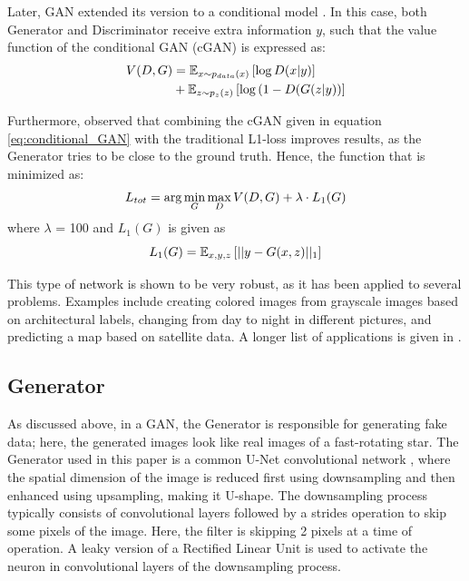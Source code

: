 Later, GAN extended its version to a conditional model \cite{mirza2014conditional}. In this case, both Generator and Discriminator receive extra information $y$, such that the value function of the conditional GAN (cGAN) is expressed as:
\begin{equation}
	\centering
	\begin{aligned}
		V(D, G) &= \mathbb{E}_{x \sim p_{data}(x)} \left[ \log D(x|y) \right] \\
		&+ \mathbb{E}_{z \sim p_{z}(z)} \left[ \log \left( 1-D(G(z|y) \right) \right]
	\end{aligned}
	\label{eq:conditional_GAN}
\end{equation}

Furthermore, \cite{isola2017image} observed that combining the cGAN given in equation \ref{eq:conditional_GAN} with the traditional L1-loss improves results, as the Generator tries to be close to the ground truth. Hence, the function that is minimized as:
\begin{equation}
	\centering
	L_{tot} = \arg \min_{G} \max_{D} V(D, G) + \lambda \cdot L_1(G)
	\label{eq:total_gen_loss}
\end{equation}
where $\lambda$ = 100 and $L_1(G)$ is given as
\begin{equation}
	\centering
	L_1(G) = \mathbb{E}_{x,y,z} \left[ ||{y - G(x,z)}||_1 \right]
	\label{eq:l1_loss}
\end{equation}

This type of network is shown to be very robust, as it has been applied to several problems. Examples include creating colored images from grayscale images based on architectural labels, changing from day to night in different pictures, and predicting a map based on satellite data. A longer list of applications is given in \cite{isola2017image}. 

\subsection{Generator}
As discussed above, in a GAN, the Generator is responsible for generating fake data; here, the generated images look like real images of a fast-rotating star. The Generator used in this paper is a common U-Net convolutional network \cite{ronneberger2015u}, where the spatial dimension of the image is reduced first using downsampling and then enhanced using upsampling, making it U-shape. The downsampling process typically consists of convolutional layers followed by a strides operation to skip some pixels of the image. Here, the filter is skipping 2 pixels at a time of operation. A leaky version of a Rectified Linear Unit is used to activate the neuron in convolutional layers of the downsampling process.

